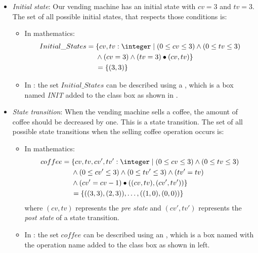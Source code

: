 \begin{itemize}
\item \textit{Initial state}: Our vending machine has an initial state with $cv = 3$ and $tv = 3$. The set of all possible initial states, that respects those conditions is:  
\begin{itemize}
\item In mathematics:
\begin{equation*}
\begin{aligned}
Initial\_States ={} & \{cv,tv: \integer\mid (0 \leq  cv \leq 3) \wedge (0 \leq  tv \leq 3)\\
      & \wedge (cv = 3) \wedge (tv = 3)\bullet(cv,tv)\} \\
      &  =\{\pair{3}{3}\}
\end{aligned}
\end{equation*}
\item In \oz{}: the set $Initial\_States$ can be described using a , which is a box named \textit{I\scriptsize{NIT}} added to the class box  as shown in .
\end{itemize}


\item \textit{State transition}: When the vending machine sells a coffee, the amount of coffee should be decreased by one. This is a state transition.
The set of all possible state transitions when the selling coffee operation occurs is:
\begin{itemize}
\item In mathematics:
\begin{equation*}
\begin{aligned}
coffee ={} & \{cv,tv,cv',tv': \integer\mid (0 \leq  cv \leq 3) \wedge (0 \leq  tv \leq 3)\\
      & \wedge (0 \leq  cv' \leq 3) \wedge (0 \leq  tv' \leq 3)\wedge (tv' = tv)  \\
      & \wedge (cv' = cv - 1) \bullet\pair{\pair{cv}{tv}}{\pair{cv'}{tv'}}\} \\
      & =\{\pair{\pair{3}{3}}{\pair{2}{3}},\dots,\pair{\pair{1}{0}}{\pair{0}{0}}\}
\end{aligned}
\end{equation*}
 where $(cv,tv)$ represents the \textit{pre state} and $(cv',tv')$ represents the \textit{post state} of a state transition.
\item In \oz{}: the set $coffee$ can be described using an , which is a box named with the operation name added to the class box as shown in  left.
\end{itemize}


\end{itemize}
